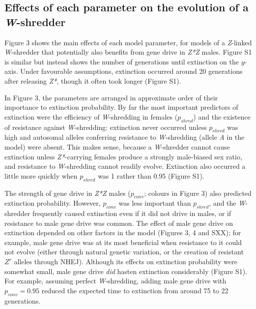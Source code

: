 \documentclass[]{rsos}%
\begin{document}
\hypertarget{effects-of-each-parameter-on-the-evolution-of-a-w-shredder}{%
\subsection{\texorpdfstring{Effects of each parameter on the evolution
of a
\emph{W}-shredder}{Effects of each parameter on the evolution of a W-shredder}}\label{effects-of-each-parameter-on-the-evolution-of-a-w-shredder}}

Figure 3 shows the main effects of each model parameter, for models of a
\emph{Z}-linked \emph{W}-shredder that potentially also benefits from
gene drive in \emph{Z*Z} males. Figure S1 is similar but instead shows
the number of generations until extinction on the \(y\)-axis. Under
favourable assumptions, extinction occurred around 20 generations after
releasing \emph{Z*}, though it often took longer (Figure S1).

In Figure 3, the parameters are arranged in approximate order of their
importance to extinction probability. By far the most important
predictors of extinction were the efficiency of \emph{W}-shredding in
females (\(p_{shred}\)) and the existence of resistance against
\emph{W}-shredding: extinction never occurred unless \(p_{shred}\) was
high and autosomal alleles conferring resistance to \emph{W}-shredding
(allele \emph{A} in the model) were absent. This makes sense, because a
\emph{W}-shredder cannot cause extinction unless \emph{Z*}-carrying
females produce a strongly male-biased sex ratio, and resistance to
\emph{W}-shredding cannot readily evolve. Extinction also occurred a
little more quickly when \(p_{shred}\) was 1 rather than 0.95 (Figure
S1).

The strength of gene drive in \emph{Z*Z} males (\(p_{conv}\); colours in
Figure 3) also predicted extinction probability. However, \(p_{conv}\)
was less important than \(p_{shred}\), and the \emph{W}-shredder
frequently caused extinction even if it did not drive in males, or if
resistance to male gene drive was common. The effect of male gene drive
on extinction depended on other factors in the model (Figures 3, 4 and
SXX); for example, male gene drive was at its most beneficial when
resistance to it could not evolve (either through natural genetic
variation, or the creation of resistant \(Z^r\) alleles through NHEJ).
Although its effects on extinction probability were somewhat small, male
gene drive \emph{did} hasten extinction considerably (Figure S1). For
example, assuming perfect \emph{W}-shredding, adding male gene drive
with \(p_{conv} = 0.95\) reduced the expected time to extinction from
around 75 to 22 generations.
\end{document}
